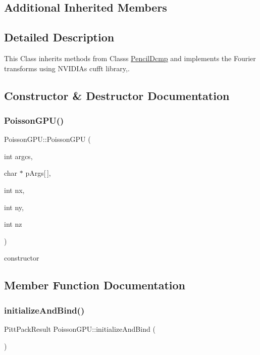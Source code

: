\subsection*{Additional Inherited Members}


\subsection{Detailed Description}
This Class inherits methods from Classs \mbox{\hyperlink{classPencilDcmp}{Pencil\+Dcmp}} and implements the Fourier transforms using N\+V\+I\+D\+IA\textquotesingle{}s cufft library,. 

\subsection{Constructor \& Destructor Documentation}
\mbox{\label{classPoissonGPU_a01e1c31e5d5ebd8531fd157662c79d87}} 
\subsubsection{\texorpdfstring{Poisson\+G\+P\+U()}{PoissonGPU()}}
{\footnotesize\ttfamily Poisson\+G\+P\+U\+::\+Poisson\+G\+PU (\begin{DoxyParamCaption}\item[{int}]{argcs,  }\item[{char $\ast$}]{p\+Args\mbox{[}$\,$\mbox{]},  }\item[{int}]{nx,  }\item[{int}]{ny,  }\item[{int}]{nz }\end{DoxyParamCaption})\hspace{0.3cm}{\ttfamily [inline]}}

constructor 

\subsection{Member Function Documentation}
\mbox{\label{classPoissonGPU_a172436deb694a44058fdc8ecc237a996}} 
\subsubsection{\texorpdfstring{initialize\+And\+Bind()}{initializeAndBind()}}
{\footnotesize\ttfamily Pitt\+Pack\+Result Poisson\+G\+P\+U\+::initialize\+And\+Bind (\begin{DoxyParamCaption}{ }\end{DoxyParamCaption})}

